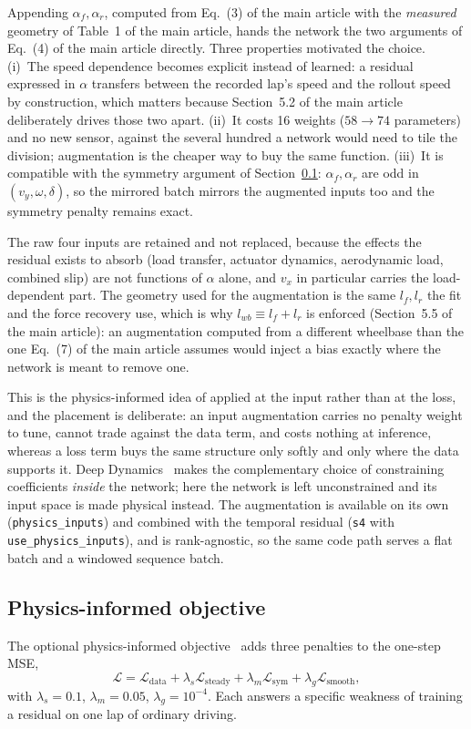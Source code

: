 \documentclass[12pt]{sn-jnl}
\begin{document}
Appending $\alpha_{f},\alpha_{r}$, computed from Eq.~(3) of the main article with the
\emph{measured} geometry of Table~1 of the main article, hands the network the two
arguments of Eq.~(4) of the main article directly. Three properties motivated the choice.
(i)~The speed dependence becomes explicit instead of learned: a residual
expressed in $\alpha$ transfers between the recorded lap's speed and the
rollout speed by construction, which matters because
Section~5.2 of the main article deliberately drives those two apart.
(ii)~It costs 16 weights ($58\rightarrow74$ parameters) and no new sensor,
against the several hundred a network would need to tile the division;
augmentation is the cheaper way to buy the same function.
(iii)~It is compatible with the symmetry argument of
Section~\ref{sup:pinnloss}: $\alpha_{f},\alpha_{r}$ are odd in
$(v_{y},\omega,\delta)$, so the mirrored batch mirrors the augmented inputs too
and the symmetry penalty remains exact.

The raw four inputs are retained and not replaced, because the effects the
residual exists to absorb (load transfer, actuator dynamics, aerodynamic load,
combined slip) are not functions of $\alpha$ alone, and $v_{x}$ in particular
carries the load-dependent part. The geometry used for the augmentation is the
same $l_{f},l_{r}$ the fit and the force recovery use, which is why
$l_{wb}\equiv l_{f}+l_{r}$ is enforced (Section~5.5 of the main article): an
augmentation computed from a different wheelbase than the one Eq.~(7) of the main article assumes would inject a bias exactly where the network is
meant to remove one.

This is the physics-informed idea of
\cite{raissi2019pinn,deepdynamics2024} applied at the input rather than at the
loss, and the placement is deliberate: an input augmentation carries no penalty
weight to tune, cannot trade against the data term, and costs nothing at
inference, whereas a loss term buys the same structure only softly and only
where the data supports it. Deep Dynamics~\cite{deepdynamics2024} makes the
complementary choice of constraining coefficients \emph{inside} the network;
here the network is left unconstrained and its input space is made physical
instead. The augmentation is available on its own (\texttt{physics\_inputs})
and combined with the temporal residual (\texttt{s4} with
\texttt{use\_physics\_inputs}), and is rank-agnostic, so the same code path
serves a flat batch and a windowed sequence batch.

\subsection{Physics-informed objective}
\label{sup:pinnloss}
The optional physics-informed
objective~\cite{raissi2019pinn,deepdynamics2024} adds three penalties to the
one-step MSE,
\begin{equation}
\mathcal{L}=\mathcal{L}_{\mathrm{data}}
+\lambda_{s}\mathcal{L}_{\mathrm{steady}}
+\lambda_{m}\mathcal{L}_{\mathrm{sym}}
+\lambda_{g}\mathcal{L}_{\mathrm{smooth}},
\label{eq:pinnloss}
\end{equation}
with $\lambda_{s}=0.1$, $\lambda_{m}=0.05$, $\lambda_{g}=10^{-4}$. Each answers
a specific weakness of training a residual on one lap of ordinary driving.
\end{document}
